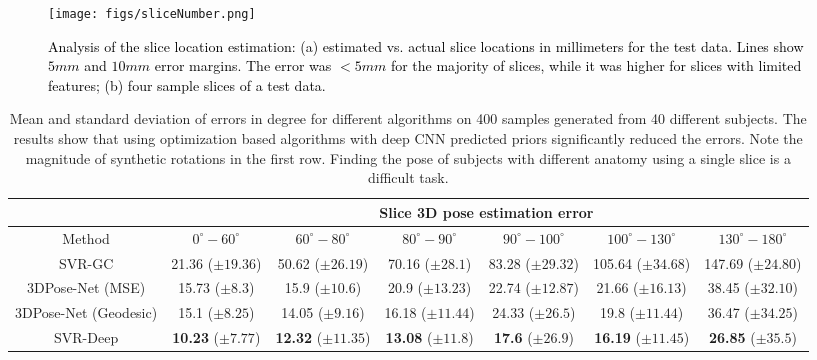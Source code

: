 \documentclass[journal,transmag]{IEEEtran}
\begin{document}
\begin{figure}
    \centering
    \texttt{[image: figs/sliceNumber.png]}
    \caption{\textcolor{black}{Analysis of the slice location estimation: (a) estimated vs. actual slice locations in millimeters for the test data. Lines show $5mm$ and $10mm$ error margins. The error was $<5mm$ for the majority of slices, while it was higher for slices with limited features; (b) four sample slices of a test data.}}
    \label{fig:Slice}
\end{figure}

\begin{table*}[h!]
\small
\centering
 \begin{tabular}{|c||c|c|c|c|c|c|} 
 \hline
  &  \multicolumn{6}{c|}{Slice 3D pose estimation error} \\
 \hline
Method & $0^{\circ} - 60^{\circ}$  & $60^{\circ} - 80^{\circ}$ & $80^{\circ} - 90^{\circ}$ & $90^{\circ} - 100^{\circ}$ & $100^{\circ} - 130^{\circ}$ & $130^{\circ} - 180^{\circ}$ \\
 \hline
SVR-GC & 21.36 ($\pm19.36$) & 50.62 ($\pm26.19$) & 70.16 ($\pm28.1$)& 83.28 ($\pm29.32$) & 105.64 ($\pm34.68$) & 147.69 ($\pm24.80$) \\ 
 \hline
 \color{black}
3DPose-Net (MSE) & 15.73 ($\pm8.3$) & 15.9 ($\pm10.6$) & 20.9 ($\pm13.23$)& 22.74 ($\pm12.87$) & 21.66 ($\pm16.13$) & 38.45 ($\pm32.10$) \color{black} \\ 
 
 \hline
3DPose-Net (Geodesic) & 15.1 ($\pm8.25$) & 14.05 ($\pm9.16$) & 16.18 ($\pm11.44$)& 24.33 ($\pm26.5$) & 19.8 ($\pm11.44$) & 36.47 ($\pm34.25$) \\ 
 \hline
SVR-Deep & \textbf{10.23} ($\pm7.77$) & \textbf{12.32} ($\pm11.35$) & \textbf{13.08} ($\pm11.8$)& \textbf{17.6} ($\pm26.9$) & \textbf{16.19} ($\pm11.45$) & \textbf{26.85} ($\pm35.5$) \\ 
 \hline
\end{tabular}
\caption{Mean and standard deviation of errors in degree for different algorithms on 400 samples generated from 40 different subjects. The results show that using optimization based algorithms with deep CNN predicted priors significantly reduced the errors. Note the magnitude of synthetic rotations in the first row. Finding the pose of subjects with different anatomy using a single slice is a difficult task.}
\label{table:S2V}
\end{table*}
\end{document}
